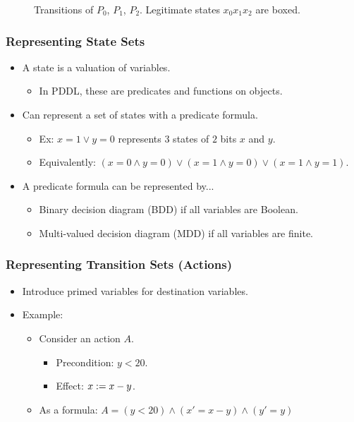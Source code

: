 \documentclass[handout]{beamer}
\begin{document}
\begin{frame}
\begin{figure}
\caption{Transitions of {\color{red!40} $P_0$}, {\color{green!50!black!75} $P_1$}, {\color{blue} $P_2$}. Legitimate states $x_0x_1x_2$ are boxed.}
\end{figure}
\end{frame}

\begin{frame}
\frametitle{Representing State Sets}
\begin{itemize}
\item A state is a valuation of variables.
 \begin{itemize}
 \item In PDDL, these are predicates and functions on objects.
 \end{itemize}
\item Can represent a set of states with a predicate formula.
 \begin{itemize}
 \item Ex: $x=1\vee y=0$ represents $3$ states of $2$ bits $x$ and $y$.
 \item Equivalently: $(x=0\wedge y=0) \vee (x=1\wedge y=0) \vee (x=1\wedge y=1)$.
 \end{itemize}
\item A predicate formula can be represented by...
 \begin{itemize}
 \item Binary decision diagram (BDD) if all variables are Boolean.
 \item Multi-valued decision diagram (MDD) if all variables are finite.
 \end{itemize}
\end{itemize}
\end{frame}

\begin{frame}
\frametitle{Representing Transition Sets (Actions)}
\begin{itemize}
\item Introduce primed variables for destination variables.
\item Example:
 \begin{itemize}
 \item Consider an action $A$.
  \begin{itemize}
  \item[] Precondition: $y < 20$.
  \item[] Effect: $x := x - y$.
  \end{itemize}
 \item As a formula: $A = (y < 20) \wedge (x' = x - y) \wedge (y' = y)$
 \end{itemize}
\end{itemize}
\end{frame}
\end{document}
